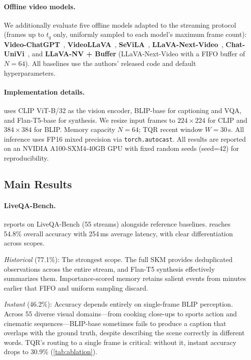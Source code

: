 \paragraph{Offline video models.}
We additionally evaluate five offline models adapted to the streaming protocol (frames up to $t_q$ only, uniformly sampled to each model's maximum frame count):
\textbf{Video-ChatGPT}~\cite{maaz2023videochatgpt},
\textbf{VideoLLaVA}~\cite{lin2023videollava},
\textbf{SeViLA}~\cite{yu2023sevila},
\textbf{LLaVA-Next-Video}~\cite{zhang2024llavanextvideo},
\textbf{Chat-UniVi}~\cite{jin2024chatunivi},
and \textbf{LLaVA-NV + Buffer} (LLaVA-Next-Video with a FIFO buffer of $N\!=\!64$).
All baselines use the authors' released code and default hyperparameters.

\paragraph{Implementation details.}
\ours uses CLIP ViT-B/32 as the vision encoder, BLIP-base for captioning and VQA, and Flan-T5-base for synthesis.
We resize input frames to $224\times224$ for CLIP and $384\times384$ for BLIP. Memory capacity $N\!=\!64$; TQR recent window $W\!=\!30$\,s.
All inference uses FP16 mixed precision via \texttt{torch.autocast}.
All results are reported on an NVIDIA A100-SXM4-40GB GPU with fixed random seeds (seed=42) for reproducibility.

\subsection{Main Results}

\paragraph{LiveQA-Bench.}
 reports \ours on LiveQA-Bench (55 streams) alongside reference baselines.
\ours reaches 54.8\% overall accuracy with 254\,ms average latency, with clear differentiation across scopes.

\noindent\textit{Historical} (77.1\%): The strongest scope. The full SKM provides deduplicated observations across the entire stream, and Flan-T5 synthesis effectively summarizes them. Importance-scored memory retains salient events from minutes earlier that FIFO and uniform sampling discard.

\noindent\textit{Instant} (46.2\%): Accuracy depends entirely on single-frame BLIP perception. Across 55 diverse visual domains---from cooking close-ups to sports action and cinematic sequences---BLIP-base sometimes fails to produce a caption that overlaps with the ground truth, despite describing the scene correctly in different words. TQR's routing to a single frame is critical: without it, instant accuracy drops to 30.9\% (\cref{tab:ablation}).

